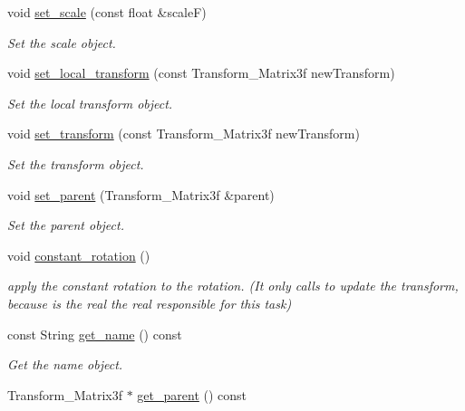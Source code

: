 \begin{DoxyCompactItemize}
void \mbox{\hyperlink{classprzurro_1_1_scene___object_a76e1fb5b58218b916a45c04101186ac7}{set\+\_\+scale}} (const float \&scaleF)
\begin{DoxyCompactList}\small\item\em Set the scale object. \end{DoxyCompactList}\item 
void \mbox{\hyperlink{classprzurro_1_1_scene___object_a1ac09f9b83e81c2baf121960b7581914}{set\+\_\+local\+\_\+transform}} (const Transform\+\_\+\+Matrix3f new\+Transform)
\begin{DoxyCompactList}\small\item\em Set the local transform object. \end{DoxyCompactList}\item 
void \mbox{\hyperlink{classprzurro_1_1_scene___object_a5fddb2cb0c950b5fb5521ccd832776c3}{set\+\_\+transform}} (const Transform\+\_\+\+Matrix3f new\+Transform)
\begin{DoxyCompactList}\small\item\em Set the transform object. \end{DoxyCompactList}\item 
void \mbox{\hyperlink{classprzurro_1_1_scene___object_aad9cc81e105d3321828287d736b01525}{set\+\_\+parent}} (Transform\+\_\+\+Matrix3f \&parent)
\begin{DoxyCompactList}\small\item\em Set the parent object. \end{DoxyCompactList}\item 
void \mbox{\hyperlink{classprzurro_1_1_scene___object_a219f3f9d5543ae2b40d4d623ae61b0ce}{constant\+\_\+rotation}} ()
\begin{DoxyCompactList}\small\item\em apply the constant rotation to the rotation. (It only calls to update the transform, because is the real the real responsible for this task) \end{DoxyCompactList}\item 
const String \mbox{\hyperlink{classprzurro_1_1_scene___object_a0814cf5dfa401ec825fc99dc4e38cfa8}{get\+\_\+name}} () const
\begin{DoxyCompactList}\small\item\em Get the name object. \end{DoxyCompactList}\item 
Transform\+\_\+\+Matrix3f $\ast$ \mbox{\hyperlink{classprzurro_1_1_scene___object_a49ee712564b1cb5cc21a58286bded165}{get\+\_\+parent}} () const

\end{DoxyCompactItemize}
